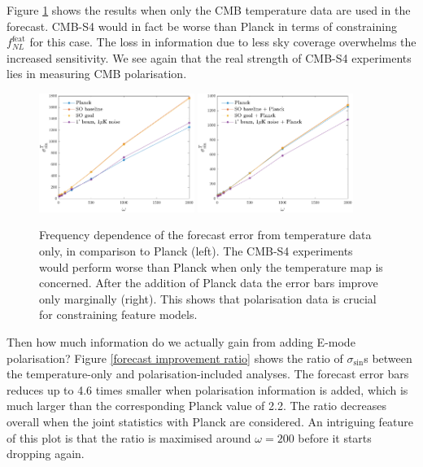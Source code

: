 Figure \ref{forecast omega dependence T} shows the results when only the CMB temperature data are used in the forecast. CMB-S4 would in fact be worse than Planck in terms of constraining $f_{NL}^\text{feat}$ for this case. The loss in information due to less sky coverage overwhelms the increased sensitivity. We see again that the real strength of CMB-S4 experiments lies in measuring CMB polarisation.

\begin{figure}[ht]
	\includegraphics[width=0.45\textwidth]{omega_dependence_T.pdf}
	\includegraphics[width=0.45\textwidth]{omega_dependence_combined_T.pdf}
	\caption{Frequency dependence of the forecast error from temperature data only, in comparison to Planck (left). The CMB-S4 experiments would perform worse than Planck when only the temperature map is concerned. After the addition of Planck data the error bars improve only marginally (right). This shows that polarisation data is crucial for constraining feature models.}
	\label{forecast omega dependence T}
\end{figure}

Then how much information do we actually gain from adding E-mode polarisation? Figure \ref{forecast improvement ratio} shows the ratio of $\sigma_{\sin}$s between the temperature-only and polarisation-included analyses. The forecast error bars reduces up to 4.6 times smaller when polarisation information is added, which is much larger than the corresponding Planck value of 2.2. The ratio decreases overall when the joint statistics with Planck are considered. An intriguing feature of this plot is that the ratio is maximised around $\omega=200$ before it starts dropping again.

